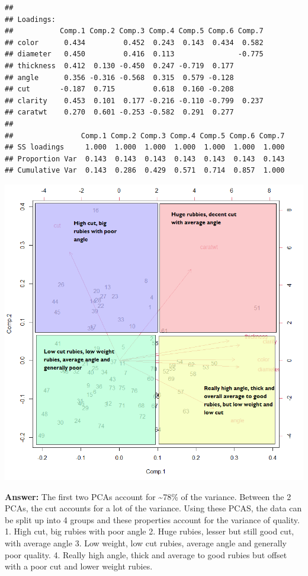 \documentclass[
  8pt,
]{article}
\begin{document}
\begin{verbatim}
## 
## Loadings:
##           Comp.1 Comp.2 Comp.3 Comp.4 Comp.5 Comp.6 Comp.7
## color      0.434         0.452  0.243  0.143  0.434  0.582
## diameter   0.450         0.416  0.113               -0.775
## thickness  0.412  0.130 -0.450  0.247 -0.719  0.177       
## angle      0.356 -0.316 -0.568  0.315  0.579 -0.128       
## cut       -0.187  0.715         0.618  0.160 -0.208       
## clarity    0.453  0.101  0.177 -0.216 -0.110 -0.799  0.237
## caratwt    0.270  0.601 -0.253 -0.582  0.291  0.277       
## 
##                Comp.1 Comp.2 Comp.3 Comp.4 Comp.5 Comp.6 Comp.7
## SS loadings     1.000  1.000  1.000  1.000  1.000  1.000  1.000
## Proportion Var  0.143  0.143  0.143  0.143  0.143  0.143  0.143
## Cumulative Var  0.143  0.286  0.429  0.571  0.714  0.857  1.000
\end{verbatim}

\includegraphics{2.2.png}

\textbf{Answer: } The first two PCAs account for \textasciitilde78\% of
the variance. Between the 2 PCAs, the cut accounts for a lot of the
variance. Using these PCAS, the data can be split up into 4 groups and
these properties account for the variance of quality. 1. High cut, big
rubies with poor angle 2. Huge rubies, lesser but still good cut, with
average angle 3. Low weight, low cut rubies, average angle and generally
poor quality. 4. Really high angle, thick and average to good rubies but
offset with a poor cut and lower weight rubies.
\end{document}
